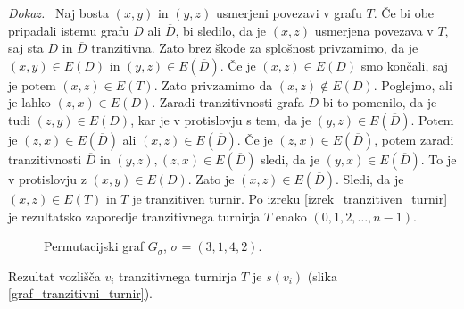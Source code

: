 \documentclass[a4paper, 12pt]{book}
\newenvironment{dokaz}{\emph{Dokaz.}\ }{\hspace{\fill}{$\Box$}}
\begin{document}
\begin{dokaz}
    Naj bosta $(x, y)$ in $(y, z)$ usmerjeni povezavi v grafu $T$. Če bi obe pripadali istemu grafu $D$ ali $\overline{D}$, bi sledilo, da je $(x, z)$ usmerjena povezava v $T$, saj sta $D$ in $\overline{D}$ tranzitivna. Zato brez škode za splošnost privzamimo, da je $(x, y) \in E(D) $ in $(y, z) \in E(\overline{D})$. Če je $(x, z) \in E(D)$ smo končali, saj je potem $(x, z) \in E(T)$. Zato privzamimo da $(x, z) \notin E(D)$. Poglejmo, ali je lahko $(z, x) \in E(D)$. Zaradi tranzitivnosti grafa $D$ bi to pomenilo, da je tudi $(z, y) \in E(D)$, kar je v protislovju s tem, da je  $(y, z) \in E(\overline{D})$. Potem je $(z, x) \in E(\overline{D})$ ali $(x, z) \in E(\overline{D})$. Če je $(z, x) \in E(\overline{D})$, potem zaradi tranzitivnosti $\overline{D}$ in $(y, z), (z, x) \in E(\overline{D})$ sledi, da je $(y, x) \in E(\overline{D})$. To je v protislovju z $(x, y) \in E(D)$. Zato je $(x, z) \in E(\overline{D})$. Sledi, da je $(x, z) \in E(T)$ in $T$ je tranzitiven turnir. Po izreku \ref{izrek_tranzitiven_turnir} je rezultatsko zaporedje tranzitivnega turnirja $T$ enako $(0, 1, 2, \dots, n-1)$. 
    \begin{figure}[h]
        \begin{center}
        \end{center}
        \caption{Permutacijski graf $G_\sigma$, $\sigma = (3, 1, 4, 2)$.}
        \label{graf_permutacije3142}
    \end{figure}
    Rezultat vozlišča $v_i$ tranzitivnega turnirja $T$ je $s(v_i)$ (slika \ref{graf_tranzitivni_turnir}).
    

\end{dokaz}
\end{document}
